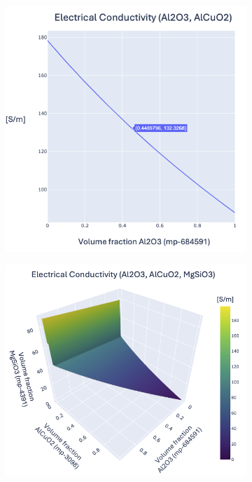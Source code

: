 \documentclass[letterpaper,12pt]{formatfile}
\begin{document}
\begin{figure}[H]
    \centering
    \begin{subfigure}[t]{0.4\textwidth}
        \centering
        \includegraphics[width=\textwidth]{figures/elec-cond-2phase-clean.png}
        \caption{}
        \label{fig:2phase}
    \end{subfigure}
    \hfill
    \begin{subfigure}[t]{0.5\textwidth}
        \centering
        \includegraphics[width=\textwidth]{figures/elec-cond-3phase-clean.png}
        \caption{}
        \label{fig:3phase}
    \end{subfigure}


\end{figure}
\end{document}
